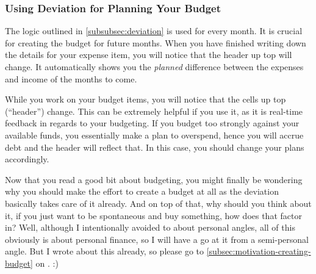 \subsubsection{Using Deviation for Planning Your Budget}
\label{subsubsec:using-deviation-while-planning-your-budget}

The logic outlined in \autoref{subsubsec:deviation} is used for every month.
It is crucial for creating the budget for future months.
When you have finished writing down the details for your expense item, you will notice that the header up top will change.
It automatically shows you the \emph{planned} difference between the expenses and income of the months to come.
\begin{specialnote}
	While you work on your budget items, you will notice that the cells up top (``header'') change.
	This can be extremely helpful if you use it, as it is real-time feedback in regards to your budgeting.
	If you budget too strongly against your available funds, you essentially make a plan to overspend, hence you will accrue debt and the header will reflect that.
	In this case, you should change your plans accordingly.
\end{specialnote}

Now that you read a good bit about budgeting, you might finally be wondering why you should make the effort to create a budget at all as the deviation basically takes care of it already.
And on top of that, why should you think about it, if you just want to be spontaneous and buy something, how does that factor in?
Well, although I intentionally avoided to about personal angles, all of this obviously is about personal finance, so I will have a go at it from a semi-personal angle.
But I wrote about this already, so please go to \autoref{subsec:motivation-creating-budget} on . :)